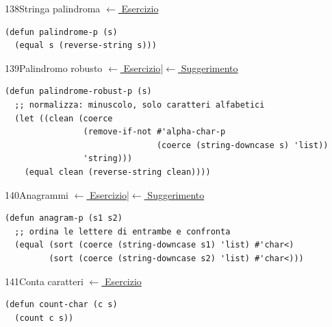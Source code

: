 \label{sol:138}
\begin{solbox}{138}{Stringa palindroma}
\small\color{black!55}\hyperref[ex:138]{$\leftarrow$ Esercizio}\normalsize\color{black}
\begin{lstlisting}
(defun palindrome-p (s)
  (equal s (reverse-string s)))
\end{lstlisting}
\end{solbox}

\label{sol:139}
\begin{solbox}{139}{Palindromo robusto}
\small\color{black!55}\hyperref[ex:139]{$\leftarrow$ Esercizio}\enspace\textcolor{black!30}{|}\enspace\hyperref[hint:139]{$\leftarrow$ Suggerimento}\normalsize\color{black}
\begin{lstlisting}
(defun palindrome-robust-p (s)
  ;; normalizza: minuscolo, solo caratteri alfabetici
  (let ((clean (coerce
                (remove-if-not #'alpha-char-p
                               (coerce (string-downcase s) 'list))
                'string)))
    (equal clean (reverse-string clean))))
\end{lstlisting}
\end{solbox}

\label{sol:140}
\begin{solbox}{140}{Anagrammi}
\small\color{black!55}\hyperref[ex:140]{$\leftarrow$ Esercizio}\enspace\textcolor{black!30}{|}\enspace\hyperref[hint:140]{$\leftarrow$ Suggerimento}\normalsize\color{black}
\begin{lstlisting}
(defun anagram-p (s1 s2)
  ;; ordina le lettere di entrambe e confronta
  (equal (sort (coerce (string-downcase s1) 'list) #'char<)
         (sort (coerce (string-downcase s2) 'list) #'char<)))
\end{lstlisting}
\end{solbox}

\label{sol:141}
\begin{solbox}{141}{Conta caratteri}
\small\color{black!55}\hyperref[ex:141]{$\leftarrow$ Esercizio}\normalsize\color{black}
\begin{lstlisting}
(defun count-char (c s)
  (count c s))
\end{lstlisting}
\end{solbox}


